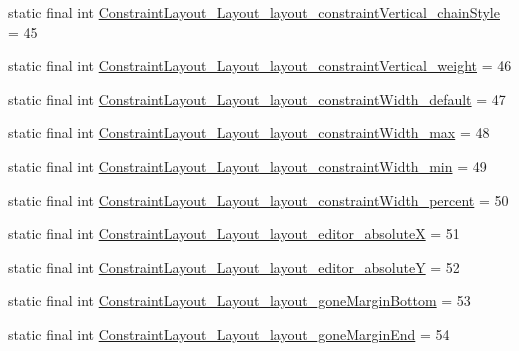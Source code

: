 \begin{DoxyCompactItemize}
\item 
static final int \mbox{\hyperlink{classandroid_1_1support_1_1constraint_1_1_r_1_1styleable_a8ee062d3be4cc02b2f86e0d35af139cf}{Constraint\+Layout\+\_\+\+Layout\+\_\+layout\+\_\+constraint\+Vertical\+\_\+chain\+Style}} = 45
\item 
static final int \mbox{\hyperlink{classandroid_1_1support_1_1constraint_1_1_r_1_1styleable_a958cb3d0c7db603c63821645b6196be1}{Constraint\+Layout\+\_\+\+Layout\+\_\+layout\+\_\+constraint\+Vertical\+\_\+weight}} = 46
\item 
static final int \mbox{\hyperlink{classandroid_1_1support_1_1constraint_1_1_r_1_1styleable_a84af0da0135a755a6faf896efcf9a647}{Constraint\+Layout\+\_\+\+Layout\+\_\+layout\+\_\+constraint\+Width\+\_\+default}} = 47
\item 
static final int \mbox{\hyperlink{classandroid_1_1support_1_1constraint_1_1_r_1_1styleable_a58a9ef15e1211d238355af16409572e2}{Constraint\+Layout\+\_\+\+Layout\+\_\+layout\+\_\+constraint\+Width\+\_\+max}} = 48
\item 
static final int \mbox{\hyperlink{classandroid_1_1support_1_1constraint_1_1_r_1_1styleable_ac9e6f0cc337028313b9f0705f1189d3f}{Constraint\+Layout\+\_\+\+Layout\+\_\+layout\+\_\+constraint\+Width\+\_\+min}} = 49
\item 
static final int \mbox{\hyperlink{classandroid_1_1support_1_1constraint_1_1_r_1_1styleable_a3ee37d0b6d46cecd1479cdab51e0c022}{Constraint\+Layout\+\_\+\+Layout\+\_\+layout\+\_\+constraint\+Width\+\_\+percent}} = 50
\item 
static final int \mbox{\hyperlink{classandroid_1_1support_1_1constraint_1_1_r_1_1styleable_a3a630dd8a36ce3807a41986aa0fe5a09}{Constraint\+Layout\+\_\+\+Layout\+\_\+layout\+\_\+editor\+\_\+absoluteX}} = 51
\item 
static final int \mbox{\hyperlink{classandroid_1_1support_1_1constraint_1_1_r_1_1styleable_a60a0b71e2940dfd8197c2071e9847161}{Constraint\+Layout\+\_\+\+Layout\+\_\+layout\+\_\+editor\+\_\+absoluteY}} = 52
\item 
static final int \mbox{\hyperlink{classandroid_1_1support_1_1constraint_1_1_r_1_1styleable_a09316ac54a83e6a6085f3234e0d5dd48}{Constraint\+Layout\+\_\+\+Layout\+\_\+layout\+\_\+gone\+Margin\+Bottom}} = 53
\item 
static final int \mbox{\hyperlink{classandroid_1_1support_1_1constraint_1_1_r_1_1styleable_ae54b563d01fb0986e67bd2d088e1389c}{Constraint\+Layout\+\_\+\+Layout\+\_\+layout\+\_\+gone\+Margin\+End}} = 54
\item 

\end{DoxyCompactItemize}
